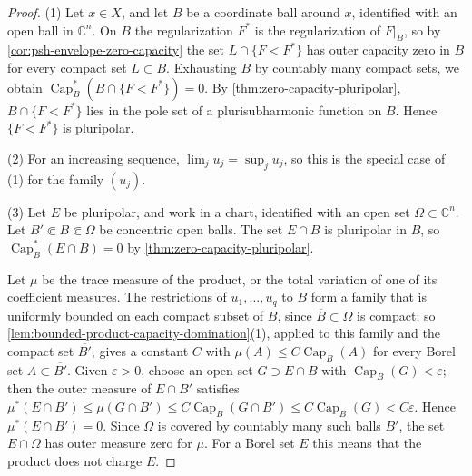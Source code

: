 \begin{proof}
(1) Let $x\in X$, and let $B$ be a coordinate ball around $x$, identified with an open ball in $\mathbb C^n$. On $B$ the regularization $F^*$ is the regularization of $F|_B$, so by \cref{cor:psh-envelope-zero-capacity} the set $L\cap\{F<F^*\}$ has outer capacity zero in $B$ for every compact set $L\subset B$. Exhausting $B$ by countably many compact sets, we obtain $\operatorname{Cap}_B^*(B\cap\{F<F^*\})=0$. By \cref{thm:zero-capacity-pluripolar}, $B\cap\{F<F^*\}$ lies in the pole set of a plurisubharmonic function on $B$. Hence $\{F<F^*\}$ is pluripolar.

(2) For an increasing sequence, $\lim_ju_j=\sup_ju_j$, so this is the special case of (1) for the family $(u_j)$.

(3) Let $E$ be pluripolar, and work in a chart, identified with an open set $\Omega\subset\mathbb C^n$. Let $B'\Subset B\Subset\Omega$ be concentric open balls. The set $E\cap B$ is pluripolar in $B$, so $\operatorname{Cap}_B^*(E\cap B)=0$ by \cref{thm:zero-capacity-pluripolar}.

Let $\mu$ be the trace measure of the product, or the total variation of one of its coefficient measures. The restrictions of $u_1,\ldots,u_q$ to $B$ form a family that is uniformly bounded on each compact subset of $B$, since $\overline B\subset\Omega$ is compact; so \cref{lem:bounded-product-capacity-domination}(1), applied to this family and the compact set $\overline{B'}$, gives a constant $C$ with $\mu(A)\le C\operatorname{Cap}_B(A)$ for every Borel set $A\subset\overline{B'}$. Given $\varepsilon>0$, choose an open set $G\supset E\cap B$ with $\operatorname{Cap}_B(G)<\varepsilon$; then the outer measure of $E\cap B'$ satisfies $\mu^*(E\cap B')\le\mu(G\cap B')\le C\operatorname{Cap}_B(G\cap B')\le C\operatorname{Cap}_B(G)<C\varepsilon$. Hence $\mu^*(E\cap B')=0$. Since $\Omega$ is covered by countably many such balls $B'$, the set $E\cap\Omega$ has outer measure zero for $\mu$. For a Borel set $E$ this means that the product does not charge $E$.
\end{proof}

